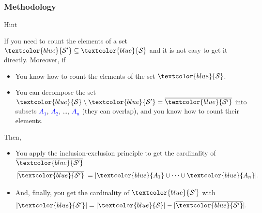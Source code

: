 \documentclass{beamer}
\newcommand{\uvalink}[2]{UVa Online Judge (http://uva.onlinejudge.org)
  problem number \href{#2}{\textcolor{blue}{#1}.}}
\newcommand{\hint}[1]{
\begin{bclogo}[arrondi=0.1, logo=\bclampe]{Hint}
#1
\end{bclogo}
}
\newcounter{exo}
\newcommand{\exo}{
  \addtocounter{exo}{1}
  Exercice \arabic{exo}
}
\begin{document}
\fi

\begin{frame}%
\frametitle{Methodology}
\footnotesize

\hint{

If you need to count the elements of a set $\textcolor{blue}{\mathcal{S'}} \subseteq \textcolor{blue}{\mathcal{S}}$ and it is not easy
to get it directly. Moreover, if

\begin{itemize}

\item<1-> You know how to count the elements of the set $\textcolor{blue}{\mathcal{S}}$.

\item<2-> You can decompose the set $\textcolor{blue}{\mathcal{S}} \setminus \textcolor{blue}{\mathcal{S'}} = \overline{\textcolor{blue}{\mathcal{S'}}}$
into subsets \textcolor{blue}{$A_1$}, \textcolor{blue}{$A_2$}, \ldots, \textcolor{blue}{$A_n$} (they can overlap), and you know how to count their elements.

\end{itemize}

\onslide<3->

Then,

\begin{itemize}

\item<3-> You apply the inclusion-exclusion principle to get the cardinality of $\overline{\textcolor{blue}{\mathcal{S'}}}$
$$
|\overline{\textcolor{blue}{\mathcal{S'}}}| = |\textcolor{blue}{A_1} \cup \cdots \cup \textcolor{blue}{A_n}|.
$$

\item<4-> And, finally, you get the cardinality of $\textcolor{blue}{\mathcal{S'}}$ with
$$
|\textcolor{blue}{\mathcal{S'}}| = |\textcolor{blue}{\mathcal{S}}| - |\overline{\textcolor{blue}{\mathcal{S'}}}|.
$$
\vspace{-0.3cm}
\end{itemize}
}
\end{frame}


\ifanswers
\end{document}
